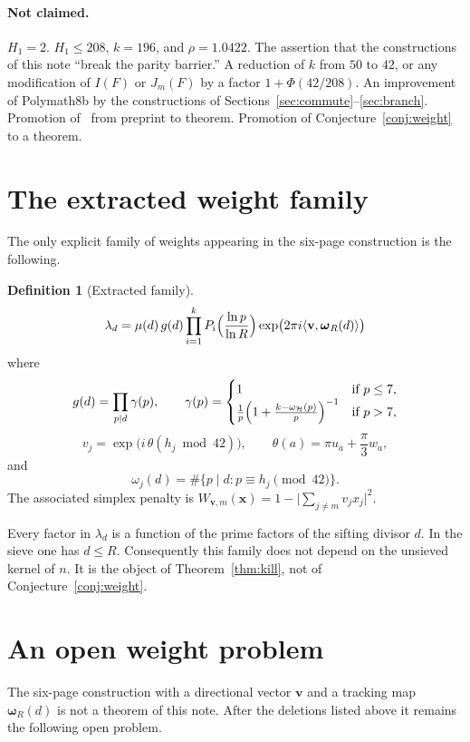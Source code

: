 \documentclass[11pt,a4paper]{article}
\theoremstyle{plain}
\theoremstyle{definition}
\newtheorem{definition}{Definition}
\theoremstyle{plain}
\numberwithin{equation}{section}
\begin{document}
\paragraph{Not claimed.}
\(H_1=2\).
\(H_1\le 208\), \(k=196\), and \(\rho=1.0422\).
The assertion that the constructions of this note ``break the parity barrier.''
A reduction of \(k\) from \(50\) to \(42\), or any modification of \(I(F)\) or \(J_m(F)\) by a factor \(1+\Phi(42/208)\).
An improvement of Polymath8b by the constructions of Sections~\ref{sec:commute}--\ref{sec:branch}.
Promotion of~\cite{Stadlmann2026} from preprint to theorem.
Promotion of Conjecture~\ref{conj:weight} to a theorem.


\section{The extracted weight family}
\label{sec:extracted}

The only explicit family of weights appearing in the six-page construction is the following.

\begin{definition}[Extracted family]
\label{def:lambda}
\[
\lambda_d=\mu(d)\,g(d)\prod_{i=1}^{k}P_i\Bigl(\frac{\ln p}{\ln R}\Bigr)
\exp\bigl(2\pi i\langle\mathbf{v},\boldsymbol{\omega}_R(d)\rangle\bigr)
\]
where
\[
g(d)=\prod_{p\mid d}\gamma(p),\qquad
\gamma(p)=\begin{cases}
1 & \text{if }p\le 7,\\
\frac1p\Bigl(1+\frac{k-\omega_{\mathcal{H}}(p)}{p}\Bigr)^{-1} & \text{if }p>7,
\end{cases}
\]
\[
v_j=\exp\bigl(i\,\theta(h_j\bmod 42)\bigr),\qquad
\theta(a)=\pi u_a+\frac\pi3 w_a,
\]
and
\[
\omega_j(d)=\#\{p\mid d:p\equiv h_j\pmod{42}\}.
\]
The associated simplex penalty is \(W_{\mathbf{v},m}(\mathbf{x})=1-\lvert\sum_{j\neq m}v_j x_j\rvert^2\).
\end{definition}

Every factor in \(\lambda_d\) is a function of the prime factors of the sifting divisor \(d\). In the sieve one has \(d\le R\). Consequently this family does not depend on the unsieved kernel of \(n\). It is the object of Theorem~\ref{thm:kill}, not of Conjecture~\ref{conj:weight}.

\section{An open weight problem}
\label{sec:conj}

The six-page construction with a directional vector \(\mathbf{v}\) and a tracking map \(\boldsymbol{\omega}_R(d)\) is not a theorem of this note. After the deletions listed above it remains the following open problem.
\end{document}
